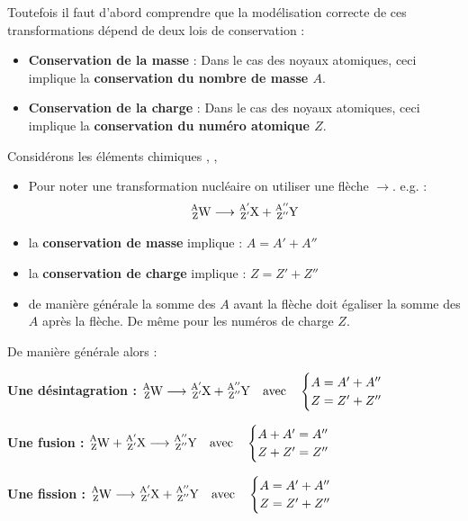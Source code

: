 \documentclass[11pt,a4paper]{article}
\begin{document}
Toutefois il faut d'abord comprendre que la modélisation correcte de ces transformations dépend de deux lois de conservation : 
\begin{itemize}
    \item \textbf{Conservation de la masse} : Dans le cas des noyaux atomiques, ceci implique la \textbf{conservation du nombre de masse $A$}. 
    \item \textbf{Conservation de la charge} : Dans le cas des noyaux atomiques, ceci implique la \textbf{conservation du numéro atomique $Z$}. 
\end{itemize}

Considérons les éléments chimiques ,  ,  
\begin{itemize}
    \item Pour noter une transformation nucléaire on utiliser une flèche $\longrightarrow$. e.g. : 
    $$\ce{^{A}_{Z}W} \longrightarrow \ce{^{A'}_{Z'}X} + \ce{^{A''}_{Z''}Y}$$
    \item la \textbf{conservation de masse} implique : $A = A' + A'' $
    \item la \textbf{conservation de charge} implique : $Z = Z' + Z''$
    \item de manière générale la somme des $A$ avant la flèche doit égaliser la somme des $A$ après la flèche. De même pour les numéros de charge $Z$. 
\end{itemize}

De manière générale alors : 

\textbf{Une désintagration : }  $\ce{^{A}_{Z}W} \longrightarrow \ce{^{A'}_{Z'}X} + \ce{^{A''}_{Z''}Y} \quad \text{avec}\quad
\begin{cases}
A = A' + A'' \\
Z = Z' + Z''
\end{cases}
$

\textbf{Une fusion : } $\ce{^{A}_{Z}W} + \ce{^{A'}_{Z'}X}  \longrightarrow \ce{^{A''}_{Z''}Y} \quad \text{avec}\quad
\begin{cases}
A + A' = A'' \\
Z + Z' = Z''
\end{cases}
$

\textbf{Une fission :} $\ce{^{A}_{Z}W} \longrightarrow \ce{^{A'}_{Z'}X} + \ce{^{A''}_{Z''}Y} \quad \text{avec}\quad
\begin{cases}
A = A' + A'' \\
Z = Z' + Z''
\end{cases}$
\end{document}
